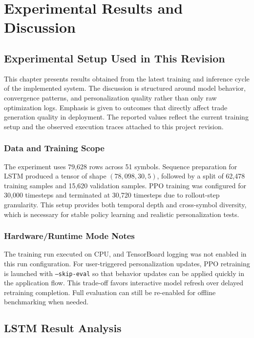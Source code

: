 \chapter{Experimental Results and Discussion}

\section{Experimental Setup Used in This Revision}

This chapter presents results obtained from the latest training and inference cycle of the implemented system. The discussion is structured around model behavior, convergence patterns, and personalization quality rather than only raw optimization logs. Emphasis is given to outcomes that directly affect trade generation quality in deployment. The reported values reflect the current training setup and the observed execution traces attached to this project revision.

\subsection{Data and Training Scope}

The experiment uses 79,628 rows across 51 symbols. Sequence preparation for LSTM produced a tensor of shape \((78{,}098, 30, 5)\), followed by a split of 62,478 training samples and 15,620 validation samples. PPO training was configured for 30,000 timesteps and terminated at 30,720 timesteps due to rollout-step granularity. This setup provides both temporal depth and cross-symbol diversity, which is necessary for stable policy learning and realistic personalization tests.

\subsection{Hardware/Runtime Mode Notes}

The training run executed on CPU, and TensorBoard logging was not enabled in this run configuration. For user-triggered personalization updates, PPO retraining is launched with \texttt{--skip-eval} so that behavior updates can be applied quickly in the application flow. This trade-off favors interactive model refresh over delayed retraining completion. Full evaluation can still be re-enabled for offline benchmarking when needed.

\section{LSTM Result Analysis}

